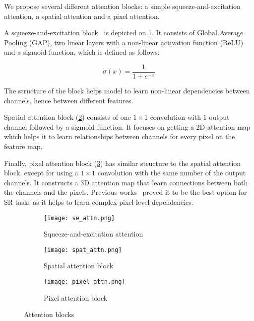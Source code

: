 \documentclass{article}
\begin{document}
We propose several different attention blocks: a simple squeeze-and-excitation attention, a spatial attention and a pixel attention.

A squeeze-and-excitation block~\cite{hu2018squeeze} is depicted on \ref{blocks:a}. It consists of Global Average Pooling (GAP), two linear layers with a non-linear activation function (ReLU) and a sigmoid function, which is defined as follows:

\begin{equation*}
    \sigma(x) = \dfrac{1}{1 + e^{-x}}
\end{equation*}

The structure of the block helps model to learn non-linear dependencies between channels, hence between different features.

Spatial attention block (\ref{blocks:b}) consists of one $1\times1$ convolution with $1$ output channel followed by a sigmoid function. It focuses on getting a 2D attention map which helps it to learn relationships between channels for every pixel on the feature map.

Finally, pixel attention block (\ref{blocks:c}) has similar structure to the spatial attention block, except for using a $1 \times 1$ convolution with the same number of the output channels. It constructs a 3D attention map that learn connections between both the channels and the pixels. Previous works~\cite{zhao2020efficient} proved it to be the best option for SR tasks as it helps to learn complex pixel-level dependencies.

\begin{figure}[h]
\centering
  \begin{subfigure}[c]{0.33\textwidth}
    \texttt{[image: se\_attn.png]}
    \caption{Squeeze-and-excitation attention} \label{blocks:a}
  \end{subfigure}%
  \hspace*{\fill}   %
  \begin{subfigure}[c]{0.33\textwidth}
    \texttt{[image: spat\_attn.png]}
    \caption{Spatial attention block} \label{blocks:b}
  \end{subfigure}%
  \hspace*{\fill}   %
  \begin{subfigure}[c]{0.33\textwidth}
    \texttt{[image: pixel\_attn.png]}
    \caption{Pixel attention block} \label{blocks:c}
  \end{subfigure}

\caption{Attention blocks} \label{blocks}
\end{figure}
\end{document}
